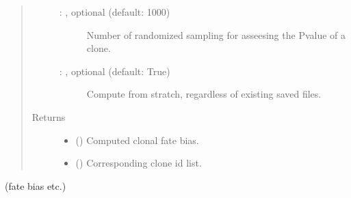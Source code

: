\documentclass[letterpaper,10pt,english]{sphinxmanual}
\begin{document}
\begin{fulllineitems}
\begin{quote}
\begin{description}
\begin{description}
\item[{ : , optional (default: 1000)}] \leavevmode
Number of randomized sampling for asseesing the Pvalue of a clone.

\item[{ : , optional (default: True)}] \leavevmode
Compute from stratch, regardless of existing saved files.

\end{description}

\item[{Returns}] \leavevmode
\begin{itemize}
\item {} 
 () \textendash{} Computed clonal fate bias.

\item {} 
 () \textendash{} Corresponding clone id list.

\end{itemize}


\end{description}\end{quote}

\end{fulllineitems}


 (fate bias etc.)
\end{document}

